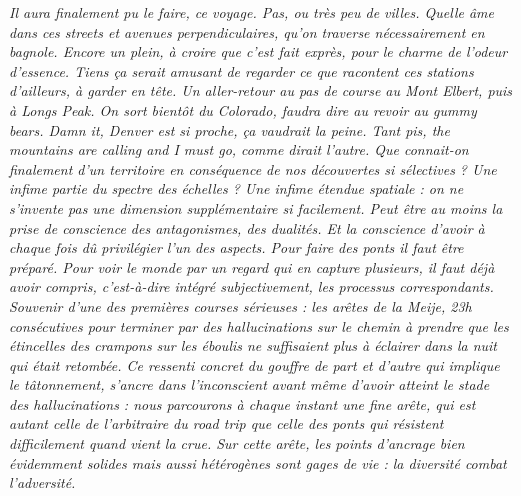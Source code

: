 {\textit{Il aura finalement pu le faire, ce voyage. Pas, ou très peu de villes. Quelle âme dans ces \emph{streets} et \emph{avenues} perpendiculaires, qu'on traverse nécessairement en bagnole. Encore un plein, à croire que c'est fait exprès, pour le charme de l'odeur d'essence. Tiens ça serait amusant de regarder ce que racontent ces stations d'ailleurs, à garder en tête. Un aller-retour au pas de course au Mont Elbert, puis à Longs Peak. On sort bientôt du Colorado, faudra dire au revoir au gummy bears. Damn it, Denver est si proche, ça vaudrait la peine. Tant pis, the mountains are calling and I must go, comme dirait l'autre. Que connait-on finalement d'un territoire en conséquence de nos découvertes si sélectives ? Une infime partie du spectre des échelles ? Une infime étendue spatiale : on ne s'invente pas une dimension supplémentaire si facilement. Peut être au moins la prise de conscience des antagonismes, des dualités. Et la conscience d'avoir à chaque fois dû privilégier l'un des aspects. Pour faire des ponts il faut être préparé. Pour voir le monde par un regard qui en capture plusieurs, il faut déjà avoir \emph{compris}, c'est-à-dire intégré subjectivement, les processus correspondants. Souvenir d'une des premières courses sérieuses : les arêtes de la Meije, 23h consécutives pour terminer par des hallucinations sur le chemin à prendre que les étincelles des crampons sur les éboulis ne suffisaient plus à éclairer dans la nuit qui était retombée. Ce ressenti concret du gouffre de part et d'autre qui implique le tâtonnement, s'ancre dans l'inconscient avant même d'avoir atteint le stade des hallucinations : nous parcourons à chaque instant une fine arête, qui est autant celle de l'arbitraire du road trip que celle des ponts qui résistent difficilement quand vient la crue. Sur cette arête, les points d'ancrage bien évidemment solides mais aussi hétérogènes sont gages de vie : la diversité combat l'adversité.}
}




\bigskip




